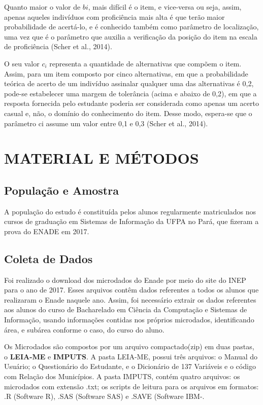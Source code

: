 \documentclass[12pt]{article}
\begin{document}
Quanto maior o valor de $b{i}$, mais difícil é o item, e vice-versa ou seja, assim, apenas aqueles indivíduos com proficiência mais alta é que terão maior probabilidade de acertá-lo, e é conhecido também como parâmetro de localização, uma vez que é o parâmetro que auxilia a verificação da posição do item na escala de proficiência (Scher et al., 2014).

O seu valor $c_{i}$  representa a quantidade de alternativas que compõem o item. Assim, para um item composto por cinco alternativas, em que a probabilidade teórica de acerto de um indivíduo assinalar qualquer uma das alternativas é 0,2, pode-se estabelecer uma margem de tolerância (acima e abaixo de 0,2), em que a resposta fornecida pelo estudante poderia ser considerada como apenas um acerto casual e, não, o domínio do conhecimento do item. Desse modo, espera-se que o parâmetro ci assume um valor entre 0,1 e 0,3 (Scher et al., 2014).




\section{MATERIAL E MÉTODOS}

\subsection{População e Amostra}
\label{sec:metmodal}

A população do estudo é constituída pelos alunos regularmente matriculados nos cursos de graduação em Sistemas de Informação da UFPA no Pará, que fizeram a prova do ENADE em 2017.\vskip0.3cm


\subsection{Coleta de Dados}

Foi realizado o download dos microdados do Enade por meio do site do INEP
para o ano de 2017. Esses arquivos contêm dados referentes a todos os alunos que realizaram o Enade naquele ano. Assim, foi necessário extrair os dados referentes aos alunos do curso de Bacharelado em Ciência da Computação e Sistemas de Informação, usando informações contidas nos próprios microdados, identificando área, e subárea conforme o caso, do curso do aluno. 

Os Microdados são compostos por um arquivo compactado(zip) em duas pastas, o \textbf{LEIA-ME} e \textbf{IMPUTS}. A pasta LEIA-ME, possui três arquivos: o Manual do Usuário; o Questionário do Estudante, e o Dicionário de 137 Variáveis e o código com Relação dos Municípios. A pasta IMPUTS, contém quatro arquivos: os microdados com extensão .txt; os scripts de leitura para os arquivos em formatos: .R (Software R), .SAS (Software SAS) e .SAVE (Software IBM-.
\end{document}
